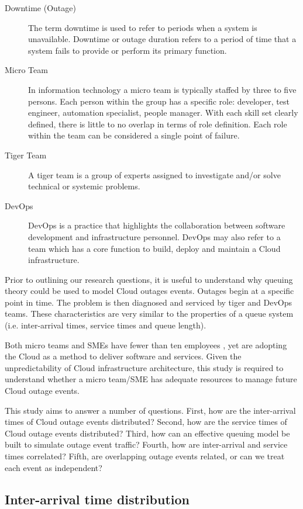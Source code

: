 \documentclass[5p]{elsarticle}
\begin{document}
\begin{description}
 \item [Downtime (Outage)] The term downtime is used to refer to periods when a system is unavailable. Downtime or outage duration refers to a period of time that a system fails to provide or perform its primary function. 
 \item  [Micro Team] In information technology a micro team is typically staffed by three to five persons. Each person within the group has a specific role: developer, test engineer, automation specialist, people manager. With each skill set clearly defined, there is little to no overlap in terms of role definition. Each role within the team can be considered a single point of failure.
  \item [Tiger Team] A tiger team is a group of experts assigned to investigate and/or solve technical or systemic problems. 
 \item [DevOps] DevOps is a practice that highlights the collaboration between software development and infrastructure personnel. DevOps may also refer to a team which has a core function to build, deploy and maintain a Cloud infrastructure. 
\end{description}

Prior to outlining our research questions, it is useful to understand why queuing theory could be used to model Cloud outages events. Outages begin at a specific point in time. The problem is then diagnosed and serviced by tiger and DevOps teams. These characteristics are very similar to the properties of a queue system (i.e. inter-arrival times, service times and queue length). 

Both micro teams and SMEs have fewer than ten employees \cite{eusmereport2015}, yet are adopting the Cloud as a method to deliver software and services. Given the unpredictability of Cloud infrastructure architecture, this study is required to understand whether a micro team/SME has adequate resources to manage future Cloud outage events. 

This study aims to answer a number of questions. First, how are the inter-arrival times of Cloud outage events distributed? Second, how are the service times of Cloud outage events distributed?  Third, how can an effective queuing model be built to simulate outage event traffic? Fourth, how are inter-arrival and service times correlated? Fifth, are overlapping outage events related, or can we treat each event as independent? 

\subsection{Inter-arrival time distribution}
\end{document}
